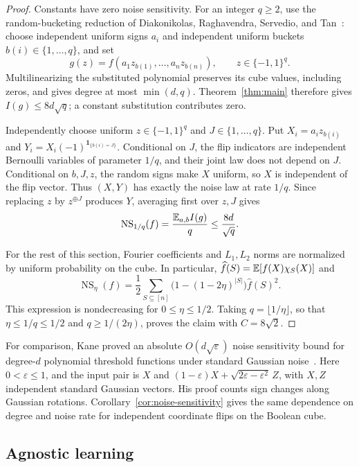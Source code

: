 \begin{proof}
Constants have zero noise sensitivity. For an integer $q\ge2$, use the
random-bucketing reduction of Diakonikolas, Raghavendra, Servedio, and
Tan~\cite[Section~7.1, equation~(14)]{DRST2014}: choose independent uniform
signs $a_i$ and independent uniform buckets $b(i)\in\{1,\ldots,q\}$,
and set
\[
 g(z)=f(a_1z_{b(1)},\ldots,a_nz_{b(n)}),
 \qquad z\in\{-1,1\}^q.
\]
Multilinearizing the substituted polynomial preserves its cube values,
including zeros, and gives degree at most $\min(d,q)$.
Theorem~\ref{thm:main} therefore gives $I(g)\le8d\sqrt q$; a constant
substitution contributes zero.

Independently choose uniform $z\in\{-1,1\}^q$ and $J\in\{1,\ldots,q\}$.
Put $X_i=a_i z_{b(i)}$ and
$Y_i=X_i(-1)^{\mathbf1_{\{b(i)=J\}}}$.
Conditional on $J$, the flip indicators are independent Bernoulli
variables of parameter $1/q$, and their joint law does not depend on $J$.
Conditional on $b,J,z$, the random signs make $X$ uniform, so $X$ is
independent of the flip vector. Thus $(X,Y)$ has exactly the
noise law at rate $1/q$. Since replacing $z$ by $z^{\oplus J}$ produces
$Y$, averaging first over $z,J$ gives
\[
 \operatorname{NS}_{1/q}(f)=\frac{\mathbb E_{a,b}I(g)}q
 \le\frac{8d}{\sqrt q}.
\]

For the rest of this section, Fourier coefficients and $L_1,L_2$ norms
are normalized by uniform probability on the cube. In particular,
$\widehat f(S)=\mathbb E[f(X)\chi_S(X)]$ and
\[
 \operatorname{NS}_{\eta}(f)
 =\frac12\sum_{S\subseteq[n]}
 \bigl(1-(1-2\eta)^{|S|}\bigr)\widehat f(S)^2.
\]
This expression is nondecreasing for $0\le\eta\le1/2$.
Taking $q=\lfloor1/\eta\rfloor$, so that
$\eta\le1/q\le1/2$ and $q\ge1/(2\eta)$, proves the claim with
$C=8\sqrt2$.
\end{proof}

For comparison, Kane proved an absolute $O(d\sqrt\varepsilon)$ noise
sensitivity bound for degree-$d$ polynomial threshold functions under
standard Gaussian noise~\cite[Theorem~1]{Kane2011}.
Here $0<\varepsilon\le1$, and the input pair is
$X$ and $(1-\varepsilon)X+\sqrt{2\varepsilon-\varepsilon^2}\,Z$,
with $X,Z$ independent standard Gaussian vectors.
His proof counts sign changes along Gaussian rotations.
Corollary~\ref{cor:noise-sensitivity} gives the same dependence on degree
and noise rate for independent coordinate flips on the Boolean cube.

\subsection{Agnostic learning}

